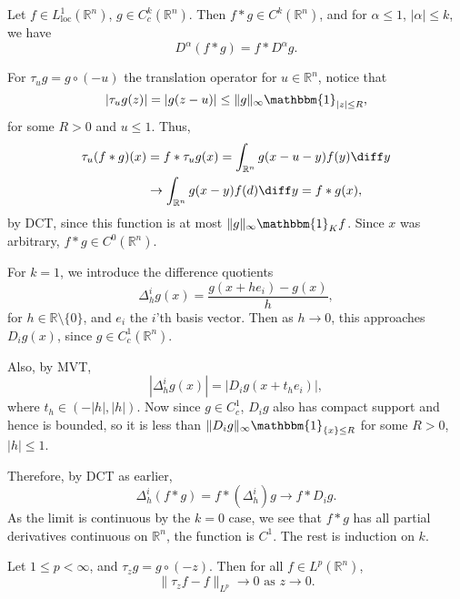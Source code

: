\documentclass[12pt]{article}
\begin{document}
\begin{theorem}
	Let $f \in L^1_{\mathrm{loc}}(\mathbb{R}^n)$, $g \in C^k_c(\mathbb{R}^n)$. Then $f \ast g \in C^k(\mathbb{R}^n)$, and for $\alpha \leq 1$, $|\alpha| \leq k$, we have
	\[
	D^\alpha (f \ast g) = f \ast D^\alpha g.
	\]
\end{theorem}

\begin{proofbox}
	For $\tau_u g = g \circ (-u)$ the translation operator for $u \in \mathbb{R}^n$, notice that
	\[
	|\tau_u g(z)| = |g(z - u)| \leq \|g\|_\infty \mathbbm{1}_{|z| \leq R},
	\]
	for some $R > 0$ and $u \leq 1$. Thus,
	\begin{align*}
		\tau_u (f \ast g)(x) &= f \ast \tau_u g(x) = \int_{\mathbb{R}^n}g(x - u - y) f(y) \diff y \\
				     & \to \int_{\mathbb{R}^n}g(x - y) f(d) \diff y = f \ast g(x),
	\end{align*}
	by DCT, since this function is at most $\|g\|_{\infty} \mathbbm{1}_{K} f$. Since $x$ was arbitrary, $f \ast g \in C^0(\mathbb{R}^n)$.

	For $k = 1$, we introduce the difference quotients
	\[
	\Delta_h^i g(x) = \frac{g(x + h e_i) - g(x)}{h},
	\]
	for $h \in \mathbb{R} \setminus \{0\}$, and $e_i$ the $i$'th basis vector. Then as $h \to 0$, this approaches $D_i g(x)$, since $g \in C^1_c(\mathbb{R}^n)$.

	Also, by MVT,
	\[
	| \Delta_h^i g(x)| = |D_i g(x + t_h e_i)|,
	\]
	where $t_h \in (-|h|, |h|)$. Now since $g \in C_c^1$, $D_i g$ also has compact support and hence is bounded, so it is less than $\| D_i g\|_\infty \mathbbm{1}_{\{x\} \leq R}$ for some $R > 0$, $|h| \leq 1$.

	Therefore, by DCT as earlier,
	\[
	\Delta_h^i (f \ast g) = f \ast (\Delta_h^i)g \to f \ast D_i g.
	\]
	As the limit is continuous by the $k = 0$ case, we see that $f \ast g$ has all partial derivatives continuous on $\mathbb{R}^n$, the function is $C^1$. The rest is induction on $k$.
\end{proofbox}

\begin{proposition}
	Let $1 \leq p < \infty$, and $\tau_z g = g \circ (-z)$. Then for all $f \in L^p(\mathbb{R}^n)$,
	\[
		\|\tau_z f - f\|_{L^p} \to 0 \text{ as } z \to 0.
	\]
\end{proposition}
\end{document}
